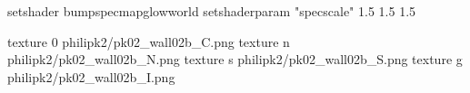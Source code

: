 setshader bumpspecmapglowworld
setshaderparam "specscale" 1.5 1.5 1.5


texture 0 philipk2/pk02_wall02b_C.png
texture n philipk2/pk02_wall02b_N.png
texture s philipk2/pk02_wall02b_S.png
texture g philipk2/pk02_wall02b_I.png

